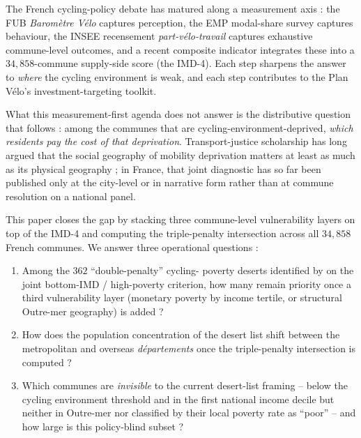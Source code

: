 \documentclass[11pt,a4paper]{article}
\begin{document}
The French cycling-policy debate has matured along a measurement
axis : the FUB \emph{Barom\`etre V\'elo} \citep{FUB2023} captures
perception, the EMP modal-share survey \citep{EMP2019} captures
behaviour, the INSEE recensement \emph{part-v\'elo-travail}
\citep{INSEEMobPro2022} captures exhaustive commune-level
outcomes, and a recent composite indicator
\citep{Fosse2026imd_national} integrates these into a
$34{,}858$-commune supply-side score (the IMD-4).  Each step
sharpens the answer to \emph{where} the cycling environment is
weak, and each step contributes to the Plan V\'elo's
\citep{PlanVelo2018} investment-targeting toolkit.

What this measurement-first agenda does not answer is the
distributive question that follows : among the communes that are
cycling-environment-deprived, \emph{which residents pay the
cost of that deprivation}.  Transport-justice scholarship
\citep{Lucas2012,Martens2012,Pereira2017,Sheller2018,Verlinghieri2020}
has long argued that the social geography of mobility deprivation
matters at least as much as its physical geography ; in France,
that joint diagnostic has so far been published only at the
city-level \citep{Cerema2022,Smith2015,Hosford2018} or in
narrative form rather than at commune resolution on a national
panel.

This paper closes the gap by stacking three commune-level
vulnerability layers on top of the IMD-4 and computing the
triple-penalty intersection across all $34{,}858$ French
communes.  We answer three operational questions :

\begin{enumerate}[leftmargin=*]
    \item[\textbf{Q1}] Among the $362$ ``double-penalty'' cycling-
          poverty deserts identified by \citet{Fosse2026imd_national}
          on the joint bottom-IMD / high-poverty criterion, how
          many remain priority once a third vulnerability layer
          (monetary poverty by income tertile, or structural
          Outre-mer geography) is added ?

    \item[\textbf{Q2}] How does the population concentration of
          the desert list shift between the metropolitan and
          overseas \emph{d\'epartements} once the triple-penalty
          intersection is computed ?

    \item[\textbf{Q3}] Which communes are \emph{invisible} to the
          current desert-list framing -- below the cycling
          environment threshold and in the first national income
          decile but neither in Outre-mer nor classified by their
          local poverty rate as ``poor'' -- and how large is this
          policy-blind subset ?
\end{enumerate}
\end{document}
